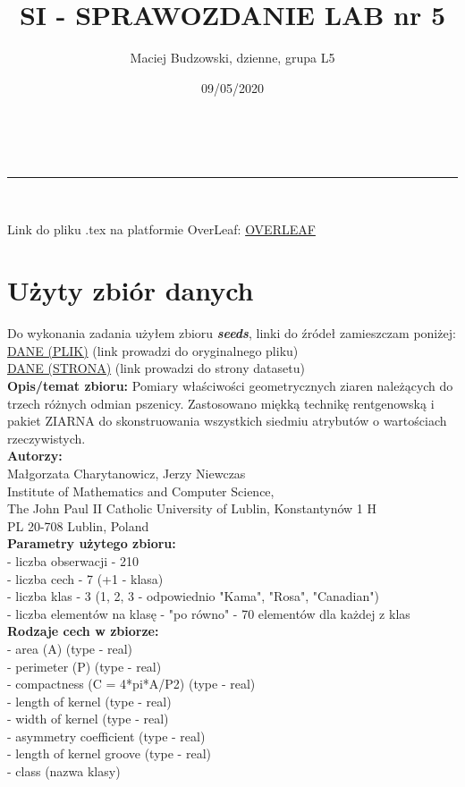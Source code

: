 \documentclass[a4paper,12pt]{article}
\makeatletter
\newcommand{\linia}{\rule{\linewidth}{0.5pt}}
\theoremstyle{mytheor}
\renewcommand{\maketitle}{
\begin{center}
\vspace{2ex}
{\huge \textsc{\@title}}
\vspace{1ex}
\\
\linia\\
\@author \hfill \@date
\vspace{4ex}
\end{center}
}
\makeatother
\begin{document}
\title{SI - SPRAWOZDANIE LAB nr 5}

\author{Maciej Budzowski, dzienne, grupa L5}

\date{09/05/2020}

\maketitle
Link do pliku .tex na platformie OverLeaf: \textcolor{red}{\href{https://www.overleaf.com/read/gtjhbdddtygc}{OVERLEAF}}

\section*{Użyty zbiór danych}

Do wykonania zadania użyłem zbioru \textbf{\emph{seeds}}, linki do źródeł zamieszczam poniżej:\\
\textcolor{red}{\href{https://archive.ics.uci.edu/ml/machine-learning-databases/00236/seeds_dataset.txt}{DANE (PLIK)}} (link prowadzi do oryginalnego pliku)\\
\textcolor{red}{\href{https://archive.ics.uci.edu/ml/datasets/seeds}{DANE (STRONA)}} (link prowadzi do strony datasetu)\\

\textbf{Opis/temat zbioru:} Pomiary właściwości geometrycznych ziaren należących do trzech różnych odmian pszenicy. Zastosowano miękką technikę rentgenowską i pakiet ZIARNA do skonstruowania wszystkich siedmiu atrybutów o wartościach rzeczywistych.\\

\textbf{Autorzy:}\\
Małgorzata Charytanowicz, Jerzy Niewczas\\
Institute of Mathematics and Computer Science,\\
The John Paul II Catholic University of Lublin, Konstantynów 1 H\\
PL 20-708 Lublin, Poland\\

\textbf{Parametry użytego zbioru:}\\
 - liczba obserwacji - 210\\
 - liczba cech - 7 (+1 - klasa)\\
 - liczba klas - 3 (1, 2, 3 - odpowiednio "Kama", "Rosa", "Canadian")\\
 - liczba elementów na klasę - "po równo" - 70 elementów dla każdej z klas\\

\textbf{Rodzaje cech w zbiorze:}\\
 - area (A) (type - real)\\
 - perimeter (P) (type - real)\\
 - compactness (C = 4*pi*A/P2) (type - real)\\
 - length of kernel (type - real)\\
 - width of kernel (type - real)\\
 - asymmetry coefficient (type - real)\\
 - length of kernel groove (type - real)\\
 - class (nazwa klasy)\\
\end{document}
